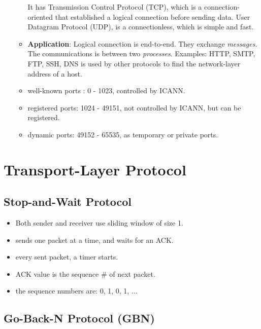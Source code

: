 \documentclass{article}
\begin{document}
\begin{itemize}
\begin{itemize}
                It has Transmission Control Protocol (TCP), which is a connection-oriented that established a logical connection
                before sending data. User Datagram Protocol (UDP), is a connectionless, which is simple and fast.
          \item \textbf{Application}: Logical connection is end-to-end. They exchange \textit{messages}.
                The communications is between two \textit{processes}. Examples: HTTP, SMTP, FTP, SSH, DNS is used by other
                protocols to find the network-layer address of a host.

          \item well-known ports : 0 - 1023, controlled by ICANN.
          \item registered ports: 1024 - 49151, not controlled by ICANN, but can be registered.
          \item dynamic ports: 49152 - 65535, as temporary or private ports.
        \end{itemize}

\end{itemize}

\section{Transport-Layer Protocol}%
\label{sec:TLP}

\subsection{Stop-and-Wait Protocol}%
\label{subsec:stop-and-wait protocols}

\begin{itemize}
  \item Both sender and receiver use sliding window of size 1.
  \item sends one packet at a time, and waits for an ACK.
  \item every sent packet, a timer starts.
  \item ACK value is the sequence \# of next packet.
  \item the sequence numbers are: 0, 1, 0, 1, $\dots$
\end{itemize}

\subsection{Go-Back-N Protocol (GBN)}%
\label{subsec:GBN}
\end{document}
